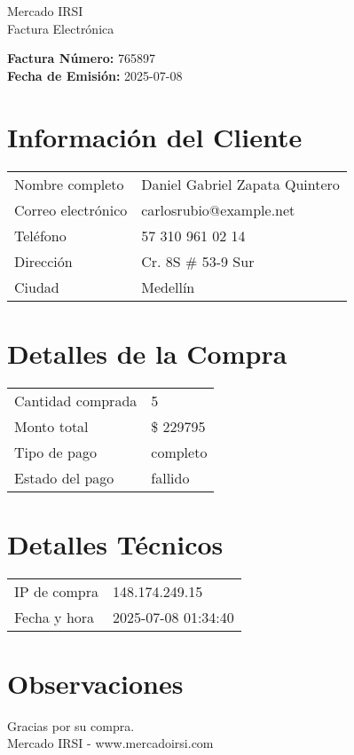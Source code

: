 \documentclass[12pt]{article}
\begin{document}
\begin{center}
    \Huge Mercado IRSI \\
    \Large Factura Electrónica
\end{center}

\vspace{0.5cm}

\noindent \textbf{Factura Número:} 765897 \\
\textbf{Fecha de Emisión:} 2025-07-08

\vspace{0.5cm}

\section*{Información del Cliente}
\begin{longtable}{ll}
Nombre completo & Daniel Gabriel Zapata Quintero \\
Correo electrónico & carlosrubio@example.net \\
Teléfono & 57 310 961 02 14 \\
Dirección & Cr. 8S \# 53-9 Sur \\
Ciudad & Medellín \\
\end{longtable}

\vspace{0.5cm}

\section*{Detalles de la Compra}
\begin{longtable}{ll}
Cantidad comprada & 5 \\
Monto total & \$ 229795 \\
Tipo de pago & completo \\
Estado del pago & fallido \\
\end{longtable}

\vspace{0.5cm}

\section*{Detalles Técnicos}
\begin{longtable}{ll}
IP de compra & 148.174.249.15 \\
Fecha y hora & 2025-07-08 01:34:40 \\
\end{longtable}

\vspace{0.5cm}

\section*{Observaciones}


\vspace{0.5cm}

\begin{center}
    Gracias por su compra. \\
    Mercado IRSI - www.mercadoirsi.com
\end{center}
\end{document}
